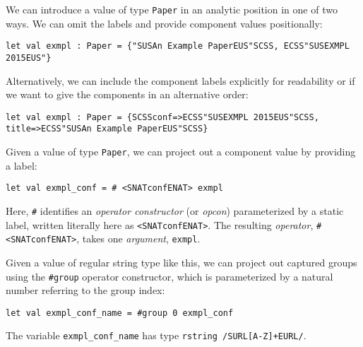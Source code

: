 
We can introduce a value of type \lstinline{Paper} in an analytic position in one of two ways. We can omit the labels and provide component values positionally:
\begin{lstlisting}[numbers=none]
let val exmpl : Paper = {"SUSAn Example PaperEUS"SCSS, ECSS"SUSEXMPL 2015EUS"}
\end{lstlisting}
Alternatively, we can include the component labels explicitly for readability or if we want to give the components in an alternative order:
\begin{lstlisting}[numbers=none]
let val exmpl : Paper = {SCSSconf=>ECSS"SUSEXMPL 2015EUS"SCSS, title=>ECSS"SUSAn Example PaperEUS"SCSS}
\end{lstlisting}

Given a value of type \lstinline{Paper}, we can project out a component value by providing  a  label:%
\begin{lstlisting}[numbers=none]
let val exmpl_conf = # <SNATconfENAT> exmpl 
\end{lstlisting}
Here, \lstinline{#} identifies an \emph{operator constructor} (or \emph{opcon}) parameterized by a static label, written literally here as \lstinline{<SNATconfENAT>}. The resulting \emph{operator}, \lstinline{# <SNATconfENAT>}, takes one \emph{argument}, \lstinline{exmpl}. 

Given a value of regular string type like this, we can project out captured groups using the \lstinline{#group} operator constructor, which is parameterized by a natural number referring to the group index:
\begin{lstlisting}[numbers=none]
let val exmpl_conf_name = #group 0 exmpl_conf
\end{lstlisting}
The variable \lstinline{exmpl_conf_name} has type \lstinline{rstring /SURL[A-Z]+EURL/}.

